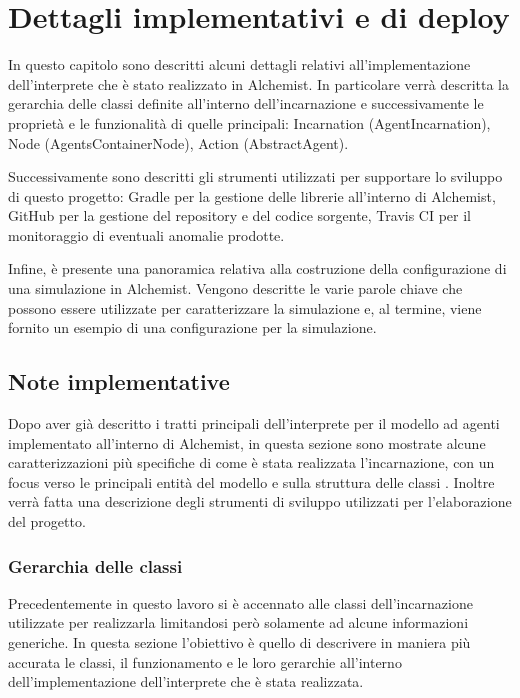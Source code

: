\chapter{Dettagli implementativi e di deploy}\label{chap:impl}
In questo capitolo sono descritti alcuni dettagli relativi all'implementazione dell'interprete che è stato realizzato in Alchemist. In particolare verrà descritta la gerarchia delle classi definite all'interno dell'incarnazione e successivamente le proprietà e le funzionalità di quelle principali: Incarnation (AgentIncarnation), Node (AgentsContainerNode), Action (AbstractAgent).

Successivamente sono descritti gli strumenti utilizzati per supportare lo sviluppo di questo progetto: Gradle per la gestione delle librerie all'interno di Alchemist, GitHub per la gestione del repository e del codice sorgente, Travis CI per il monitoraggio di eventuali anomalie prodotte.

Infine, è presente una panoramica relativa alla costruzione della configurazione di una simulazione in Alchemist. Vengono descritte le varie parole chiave che possono essere utilizzate per caratterizzare la simulazione e, al termine, viene fornito un esempio di una configurazione per la simulazione.

\section{Note implementative}
Dopo aver già descritto i tratti principali dell'interprete per il modello ad agenti implementato all'interno di Alchemist, in questa sezione sono mostrate alcune caratterizzazioni più specifiche di come è stata realizzata l'incarnazione, con un focus verso le principali entità del modello e sulla struttura delle classi .
Inoltre verrà fatta una descrizione degli strumenti di sviluppo utilizzati per l'elaborazione del progetto.

\subsection{Gerarchia delle classi}
Precedentemente in questo lavoro si è accennato alle classi dell'incarnazione utilizzate per realizzarla limitandosi però solamente ad alcune informazioni generiche. In questa sezione l'obiettivo è quello di descrivere in maniera più accurata le classi, il funzionamento e le loro gerarchie all'interno dell'implementazione dell'interprete che è stata realizzata.

